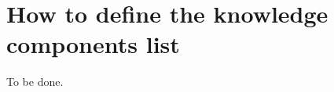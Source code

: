 \section{How to define the knowledge components list}
\label{sec:how_to_define_the_knowledge_components_list}

To be done.

